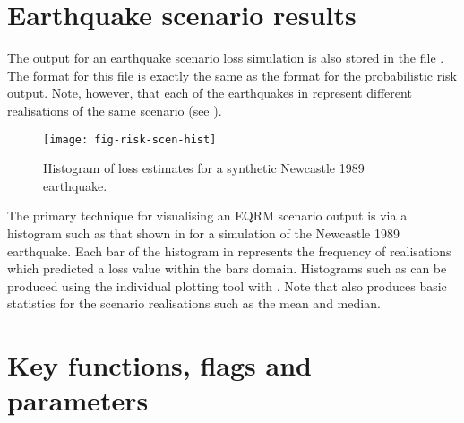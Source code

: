 \section{Earthquake scenario results}

The output for an earthquake scenario loss simulation is also
stored in the file
. The format
for this file is exactly the same as the format for the
probabilistic risk output. Note, however, that each of the
earthquakes in 
represent different realisations of the same scenario (see
).
\begin{figure}
\texttt{[image: fig-risk-scen-hist]}
\caption{Histogram of loss estimates for a synthetic Newcastle
1989 earthquake.} \label{fig:scenario-hist}
\end{figure}
The primary technique for visualising an EQRM scenario output is
via a histogram such as that shown in  for
a simulation of the Newcastle 1989 earthquake. Each bar of the
histogram in  represents the frequency of
realisations which predicted a loss value within the bars domain.
Histograms such as  can be produced using
the individual plotting tool
 with
. Note that
 also produces basic
statistics for the scenario realisations such as the mean and
median.



\section{Key functions, flags and parameters}

